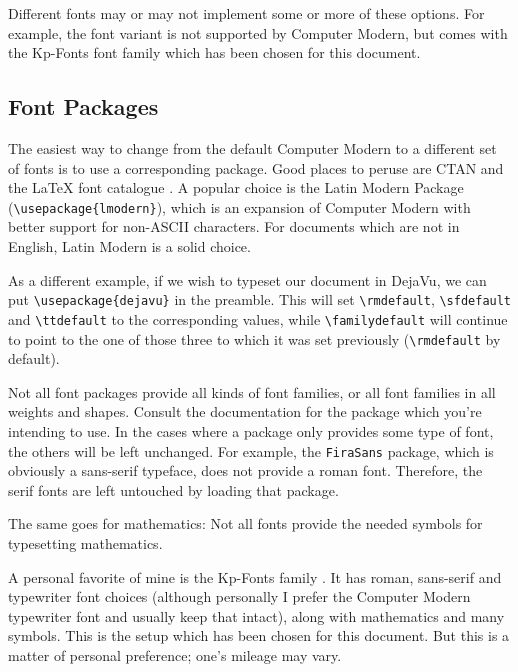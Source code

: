 \documentclass[a4paper,oneside,11pt]{article}
\newcommand\compar[2]{\texttt{\textbackslash #1\{#2\}}}
\newcommand\comm[1]{\texttt{\textbackslash#1}}
\newcommand\code[1]{\texttt{#1}}
\begin{document}
Different fonts  may or may not  implement some or more  of these options. For
example, the    font variant is not  supported by
Computer Modern, but comes with the Kp-Fonts font family which has been chosen
for this document.


\subsection{Font Packages}
\label{subsec:font-packages}

The easiest way to change from the  default Computer Modern to a different set
of fonts  is to use  a corresponding package. Good  places to peruse  are CTAN
\cite{ctan:fonts} and  the \LaTeX{} font  catalogue \cite{tug:font-catalog}. A
popular  choice is  the  Latin  Modern Package  (\verb|\usepackage{lmodern}|),
which is  an expansion of  Computer Modern  with better support  for non-ASCII
characters. For documents  which are not in  English, Latin Modern is  a solid
choice.

As  a  different example,  if  we  wish to  typeset  our  document in  DejaVu,
we  can  put  \compar{usepackage}{dejavu}{}  in the  preamble. This  will  set
\comm{rmdefault}, \comm{sfdefault}  and \comm{ttdefault} to  the corresponding
values, while \comm{familydefault} will continue to  point to the one of those
three to which it was set previously (\comm{rmdefault} by default).

Not all font packages provide all kinds of font families, or all font families
in all  weights and  shapes. Consult the documentation  for the  package which
you're intending to use. In the cases  where a package only provides some type
of font, the  others will be left unchanged. For  example, the \code{FiraSans}
package, which  is obviously a sans-serif  typeface, does not provide  a roman
font. Therefore, the serif fonts are left untouched by loading that package.

The same  goes for mathematics: Not all  fonts provide the needed  symbols for
typesetting mathematics.

A personal  favorite of mine  is the Kp-Fonts family  \cite{ctan:kpfonts}.  It
has  roman, sans-serif  and  typewriter font  choices  (although personally  I
prefer  the Computer  Modern typewriter  font and  usually keep  that intact),
along with  mathematics and  many symbols. This  is the  setup which  has been
chosen for this  document. But this is a matter of  personal preference; one's
mileage may vary.
\end{document}
